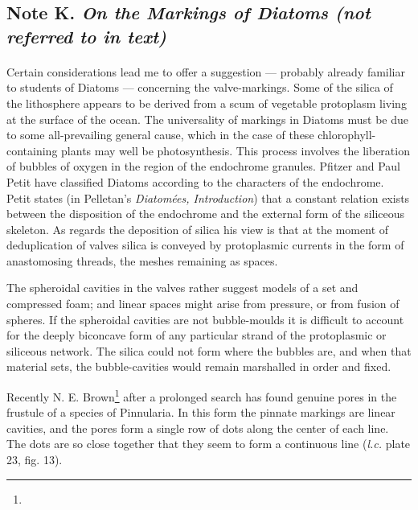 \documentclass[a4paper, 12pt, oneside]{article}
\begin{document}
\subsection{Note K. \emph{On the Markings of Diatoms (not referred to in text)}}
\paragraph{}
Certain considerations lead me to offer a suggestion --- probably already familiar to students of Diatoms --- concerning the valve-markings. Some of the silica of the lithosphere appears to be derived from a scum of vegetable protoplasm living at the surface of the ocean. The universality of markings in Diatoms must be due to some all-prevailing general cause, which in the case of these chlorophyll-containing plants may well be photosynthesis. This process involves the liberation of bubbles of oxygen in the region of the endochrome granules. Pfitzer and Paul Petit have classified Diatoms according to the characters of the endochrome. Petit states (in Pelletan's \emph{Diatomées, Introduction}) that a constant relation exists between the disposition of the endochrome and the external form of the siliceous skeleton. As regards the deposition of silica his view is that at the moment of deduplication of valves silica is conveyed by protoplasmic currents in the form of anastomosing threads, the meshes remaining as spaces.

The spheroidal cavities in the valves rather suggest models of a set and compressed foam; and linear spaces might arise from pressure, or from fusion of spheres. If the spheroidal cavities are not bubble-moulds it is difficult to account for the deeply biconcave form of any particular strand of the protoplasmic or siliceous network. The silica could not form where the bubbles are, and when that material sets, the bubble-cavities would remain marshalled in order and fixed.

Recently N. E. Brown\footnote{} after a prolonged search has found genuine pores in the frustule of a species of Pinnularia. In this form the pinnate markings are linear cavities, and the pores form a single row of dots along the center of each line. The dots are so close together that they seem to form a continuous line (\emph{l.c.} plate 23, fig. 13).
\end{document}
